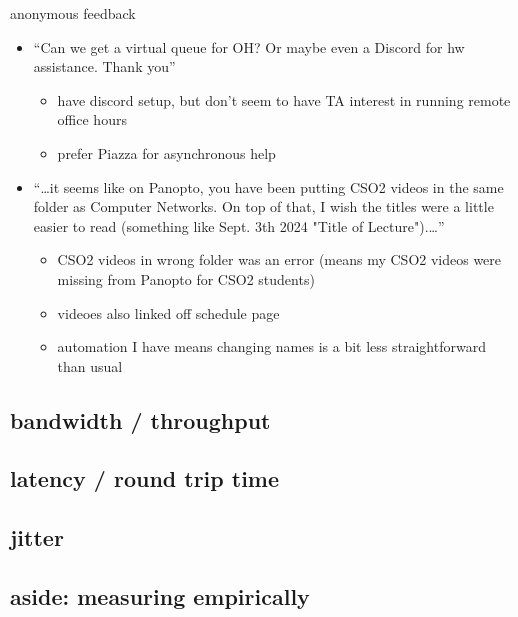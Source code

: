\begin{frame}{anonymous feedback}
    \begin{itemize}
    \item ``Can we get a virtual queue for OH? Or maybe even a Discord for hw assistance. Thank you''
        \begin{itemize}
        \item have discord setup, but don't seem to have TA interest in running remote office hours
        \item prefer Piazza for asynchronous help
        \end{itemize}
    \item ``\ldots it seems like on Panopto, you have been putting CSO2 videos in the same folder as Computer Networks. On top of that, I wish the titles were a little easier to read (something like Sept. 3th 2024 "Title of Lecture").\ldots''
        \begin{itemize}
        \item CSO2 videos in wrong folder was an error (means my CSO2 videos were missing from Panopto for CSO2 students)
        \item videoes also linked off schedule page
        \item automation I have means changing names is a bit less straightforward than usual
        \end{itemize}
    \end{itemize}
\end{frame}

\subsection{bandwidth / throughput}


\subsection{latency / round trip time}


\subsection{jitter}


\subsection{aside: measuring empirically}


